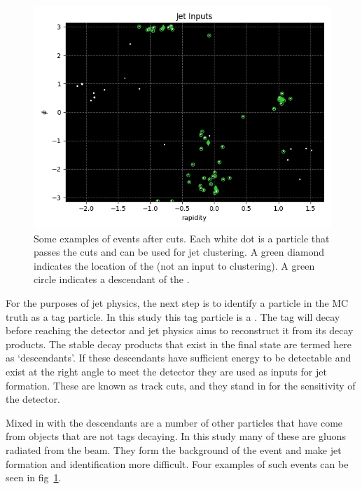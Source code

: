 \begin{figure}[htp]
\begin{minipage}[c]{0.48\textwidth}
        \includegraphics[width=1\textwidth]{graphics/truth_1378.png}
    \end{minipage}\hfill
    \caption{Some examples of events after cuts. Each white dot is a particle that
             passes the cuts and can be used for jet clustering.
             A green diamond indicates the location of the 
             (not an input to clustering).
         A green circle indicates a descendant of the .} \label{fig:event_tracks_example}
\end{figure}    


For the purposes of jet physics, the next step is to identify
a particle in the MC truth as a tag particle.
In this study this tag particle is a .
The tag will decay before reaching the detector and 
jet physics aims to reconstruct it from its decay products.
The stable decay products that exist in the final state 
are termed here as `descendants'.
If these descendants have sufficient energy to be detectable and exist
at the right angle to meet the detector they are used as inputs for jet formation.
These are known as track cuts, and they stand in for the sensitivity of the detector.

Mixed in with the descendants are a number of other particles that have come from objects
that are not tags decaying.
In this study many of these are gluons radiated from the beam.
They form the background of the event and make jet formation
and identification more difficult.
Four examples of such events can be seen in fig~\ref{fig:event_tracks_example}.
